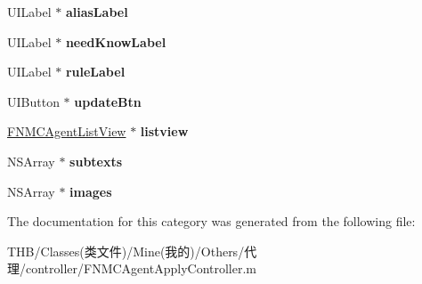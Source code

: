 \begin{DoxyCompactItemize}
U\+I\+Label $\ast$ {\bfseries alias\+Label}
\item 
\mbox{\label{category_f_n_m_c_agent_apply_controller_07_08_a920ff663548f0fe31d9e0d2fc70ad847}} 
U\+I\+Label $\ast$ {\bfseries need\+Know\+Label}
\item 
\mbox{\label{category_f_n_m_c_agent_apply_controller_07_08_a0fc31df478b1b4c84e8e9929fcd3993a}} 
U\+I\+Label $\ast$ {\bfseries rule\+Label}
\item 
\mbox{\label{category_f_n_m_c_agent_apply_controller_07_08_a010975681576445852da3530c5c10e32}} 
U\+I\+Button $\ast$ {\bfseries update\+Btn}
\item 
\mbox{\label{category_f_n_m_c_agent_apply_controller_07_08_a562bdd896ad83e3852632429e4fa8865}} 
\mbox{\hyperlink{interface_f_n_m_c_agent_list_view}{F\+N\+M\+C\+Agent\+List\+View}} $\ast$ {\bfseries listview}
\item 
\mbox{\label{category_f_n_m_c_agent_apply_controller_07_08_a291e6f14cd6b3198f33b99e658996bca}} 
N\+S\+Array $\ast$ {\bfseries subtexts}
\item 
\mbox{\label{category_f_n_m_c_agent_apply_controller_07_08_a1df00093c79cebb03706c87c839ecbfb}} 
N\+S\+Array $\ast$ {\bfseries images}
\end{DoxyCompactItemize}


The documentation for this category was generated from the following file\+:\begin{DoxyCompactItemize}
\item 
T\+H\+B/\+Classes(类文件)/\+Mine(我的)/\+Others/代理/controller/F\+N\+M\+C\+Agent\+Apply\+Controller.\+m\end{DoxyCompactItemize}

